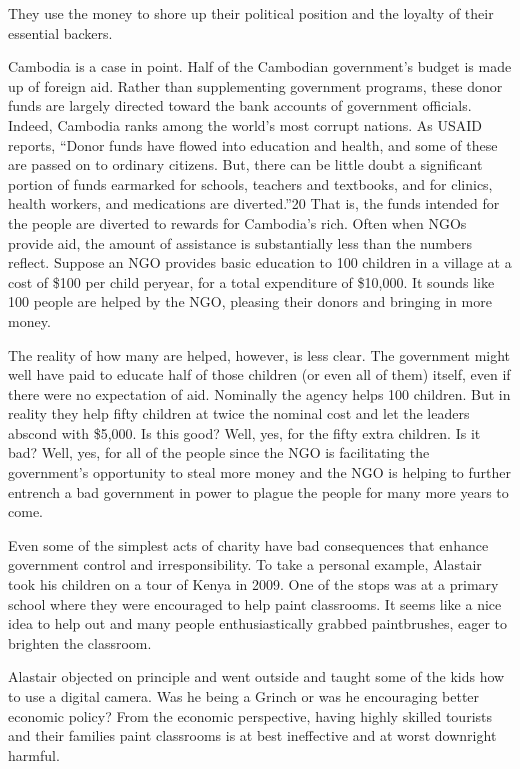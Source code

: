 \documentclass[10pt]{article}
\begin{document}
{\large They use the money to shore up their political position and the loyalty
of their essential backers.}

{\large Cambodia is a case in point. Half of the Cambodian government's budget
is made up of foreign aid. Rather than supplementing government programs, these
donor funds are largely directed toward the bank accounts of government
officials. Indeed, Cambodia ranks among the world's most corrupt nations. As
USAID reports, ``Donor funds have flowed into education and health, and some of
these are passed on to ordinary citizens. But, there can be little doubt a
significant portion of funds earmarked for schools, teachers and textbooks, and
for clinics, health workers, and medications are diverted.''20 That is, the funds
intended for the people are diverted to rewards for Cambodia's rich. Often when
NGOs provide aid, the amount of assistance is substantially less than the numbers
reflect. Suppose an NGO provides basic education to 100 children in a village at
a cost of \$100 per child peryear, for a total expenditure of \$10,000. It sounds
like 100 people are helped by the NGO, pleasing their donors and bringing in more
money.}

{\large The reality of how many are helped, however, is less clear. The
government might well have paid to educate half of those children (or even all of
them) itself, even if there were no expectation of aid. Nominally the agency
helps 100 children. But in reality they help fifty children at twice the nominal
cost and let the leaders abscond with \$5,000. Is this good? Well, yes, for the
fifty extra children. Is it bad? Well, yes, for all of the people since the NGO
is facilitating the government's opportunity to steal more money and the NGO is
helping to further entrench a bad government in power to plague the people for
many more years to come.}

{\large Even some of the simplest acts of charity have bad consequences that
enhance government control and irresponsibility. To take a personal example,
Alastair took his children on a tour of Kenya in 2009. One of the stops was at a
primary school where they were encouraged to help paint classrooms. It seems like
a nice idea to help out and many people enthusiastically grabbed paintbrushes,
eager to brighten the classroom.}

{\large Alastair objected on principle and went outside and taught some of the
kids how to use a digital camera. Was he being a Grinch or was he encouraging
better economic policy? From the economic perspective, having highly skilled
tourists and their families paint classrooms is at best ineffective and at worst
downright harmful.}
\end{document}
